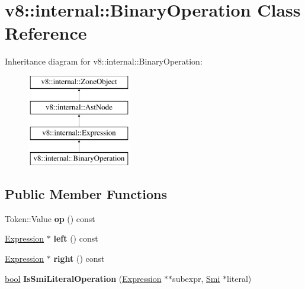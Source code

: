 \hypertarget{classv8_1_1internal_1_1BinaryOperation}{}\section{v8\+:\+:internal\+:\+:Binary\+Operation Class Reference}
\label{classv8_1_1internal_1_1BinaryOperation}
Inheritance diagram for v8\+:\+:internal\+:\+:Binary\+Operation\+:\begin{figure}[H]
\begin{center}
\leavevmode
\includegraphics[height=4.000000cm]{classv8_1_1internal_1_1BinaryOperation}
\end{center}
\end{figure}
\subsection*{Public Member Functions}
\begin{DoxyCompactItemize}
\item 
\mbox{\label{classv8_1_1internal_1_1BinaryOperation_a338dfcb619e84c079e791585540bbc1c}} 
Token\+::\+Value {\bfseries op} () const
\item 
\mbox{\label{classv8_1_1internal_1_1BinaryOperation_a98a50e1c641c9e0f0ce2decb60aae723}} 
\mbox{\hyperlink{classv8_1_1internal_1_1Expression}{Expression}} $\ast$ {\bfseries left} () const
\item 
\mbox{\label{classv8_1_1internal_1_1BinaryOperation_a8baf514c28397718f3ab6f2377d147b4}} 
\mbox{\hyperlink{classv8_1_1internal_1_1Expression}{Expression}} $\ast$ {\bfseries right} () const
\item 
\mbox{\label{classv8_1_1internal_1_1BinaryOperation_a3b58c01628f4e5e50b32c6f03f4ac2f2}} 
\mbox{\hyperlink{classbool}{bool}} {\bfseries Is\+Smi\+Literal\+Operation} (\mbox{\hyperlink{classv8_1_1internal_1_1Expression}{Expression}} $\ast$$\ast$subexpr, \mbox{\hyperlink{classv8_1_1internal_1_1Smi}{Smi}} $\ast$literal)
\end{DoxyCompactItemize}
